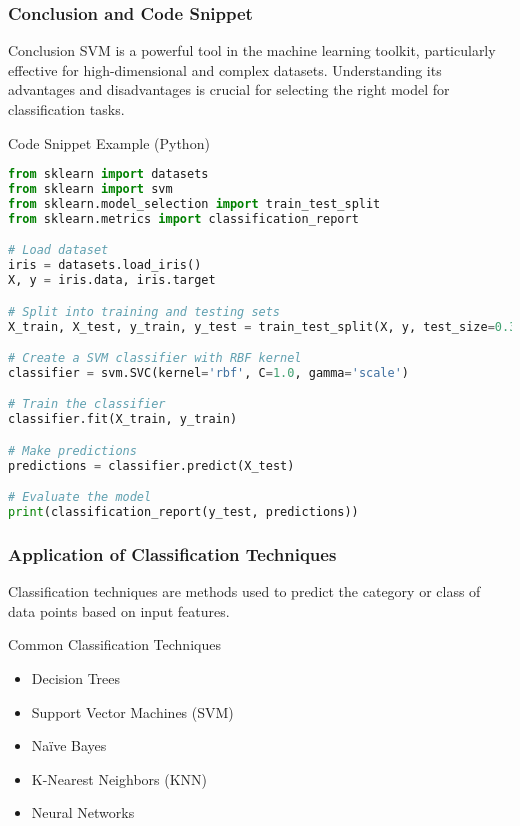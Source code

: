 \documentclass[aspectratio=169]{beamer}
\begin{document}
\begin{frame}[fragile]
    \frametitle{Conclusion and Code Snippet}
    \begin{block}{Conclusion}
        SVM is a powerful tool in the machine learning toolkit, particularly effective for high-dimensional and complex datasets. 
        Understanding its advantages and disadvantages is crucial for selecting the right model for classification tasks.
    \end{block}
    
    \begin{block}{Code Snippet Example (Python)}
    \begin{lstlisting}[language=Python]
from sklearn import datasets
from sklearn import svm
from sklearn.model_selection import train_test_split
from sklearn.metrics import classification_report

# Load dataset
iris = datasets.load_iris()
X, y = iris.data, iris.target

# Split into training and testing sets
X_train, X_test, y_train, y_test = train_test_split(X, y, test_size=0.3, random_state=42)

# Create a SVM classifier with RBF kernel
classifier = svm.SVC(kernel='rbf', C=1.0, gamma='scale')

# Train the classifier
classifier.fit(X_train, y_train)

# Make predictions
predictions = classifier.predict(X_test)

# Evaluate the model
print(classification_report(y_test, predictions))
    \end{lstlisting}
    \end{block}
\end{frame}

\begin{frame}
    \frametitle{Application of Classification Techniques}
    Classification techniques are methods used to predict the category or class of data points based on input features. 
    \begin{block}{Common Classification Techniques}
        \begin{itemize}
            \item Decision Trees
            \item Support Vector Machines (SVM)
            \item Naïve Bayes
            \item K-Nearest Neighbors (KNN)
            \item Neural Networks
        \end{itemize}
    \end{block}
\end{frame}
\end{document}
